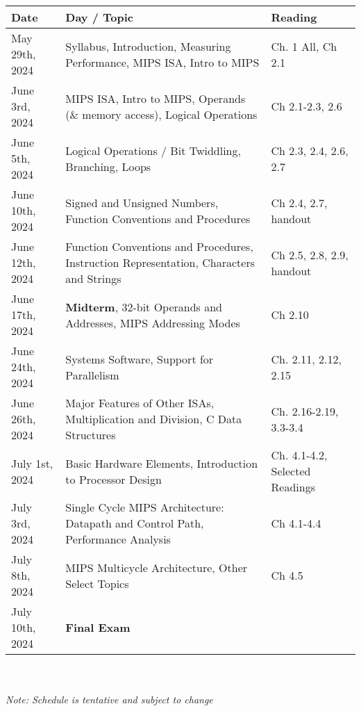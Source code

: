\renewcommand{\arraystretch}{1.5}
\begin{tabular}{ | l | L{9cm} | L{3cm} | }
    \hline
    Date & Day / Topic & Reading \\
    \hline
    May 29th, 2024 & Syllabus, Introduction, Measuring Performance, MIPS ISA, Intro to MIPS & Ch. 1 All, Ch 2.1 \\
    \hline
    June 3rd, 2024 & MIPS ISA, Intro to MIPS, Operands (\& memory access), Logical Operations & Ch 2.1-2.3, 2.6 \\
    \hline
    June 5th, 2024 & Logical Operations / Bit Twiddling, Branching, Loops & Ch 2.3, 2.4, 2.6, 2.7 \\
    \hline
    June 10th, 2024 & Signed and Unsigned Numbers, Function Conventions and Procedures & Ch 2.4, 2.7, handout \\
    \hline
    June 12th, 2024 & Function Conventions and Procedures, Instruction Representation, Characters and Strings & Ch 2.5, 2.8, 2.9, handout \\
    \hline
    June 17th, 2024 & \textbf{Midterm}, 32-bit Operands and Addresses, MIPS Addressing Modes & Ch 2.10 \\
    \hline
    June 24th, 2024 & Systems Software, Support for Parallelism & Ch. 2.11, 2.12, 2.15 \\
    \hline
    June 26th, 2024 & Major Features of Other ISAs, Multiplication and Division, C Data Structures & Ch. 2.16-2.19, 3.3-3.4 \\
    \hline
    July 1st, 2024 & Basic Hardware Elements, Introduction to Processor Design & Ch. 4.1-4.2, Selected Readings \\
    \hline
    July 3rd, 2024 & Single Cycle MIPS Architecture: Datapath and Control Path, Performance Analysis & Ch 4.1-4.4 \\
    \hline
    July 8th, 2024 & MIPS Multicycle Architecture, Other Select Topics & Ch 4.5 \\
    \hline 
    July 10th, 2024 & \textbf{Final Exam} & \\
    \hline
\end{tabular}
\\ \\
\textit{Note: Schedule is tentative and subject to change}



